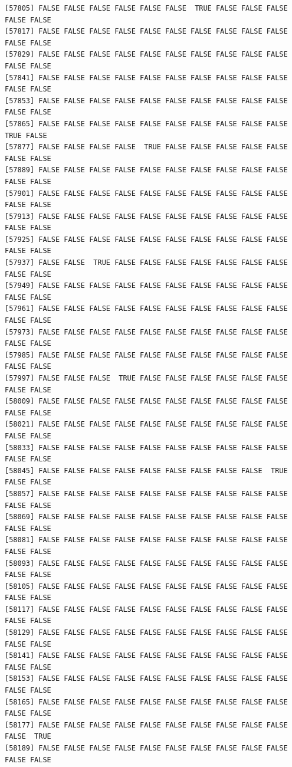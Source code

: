 \documentclass[
  a4paper,
  DIV=11,
  numbers=noendperiod]{scrartcl}
\begin{document}
\begin{verbatim}
[57805] FALSE FALSE FALSE FALSE FALSE FALSE  TRUE FALSE FALSE FALSE FALSE FALSE
[57817] FALSE FALSE FALSE FALSE FALSE FALSE FALSE FALSE FALSE FALSE FALSE FALSE
[57829] FALSE FALSE FALSE FALSE FALSE FALSE FALSE FALSE FALSE FALSE FALSE FALSE
[57841] FALSE FALSE FALSE FALSE FALSE FALSE FALSE FALSE FALSE FALSE FALSE FALSE
[57853] FALSE FALSE FALSE FALSE FALSE FALSE FALSE FALSE FALSE FALSE FALSE FALSE
[57865] FALSE FALSE FALSE FALSE FALSE FALSE FALSE FALSE FALSE FALSE  TRUE FALSE
[57877] FALSE FALSE FALSE FALSE  TRUE FALSE FALSE FALSE FALSE FALSE FALSE FALSE
[57889] FALSE FALSE FALSE FALSE FALSE FALSE FALSE FALSE FALSE FALSE FALSE FALSE
[57901] FALSE FALSE FALSE FALSE FALSE FALSE FALSE FALSE FALSE FALSE FALSE FALSE
[57913] FALSE FALSE FALSE FALSE FALSE FALSE FALSE FALSE FALSE FALSE FALSE FALSE
[57925] FALSE FALSE FALSE FALSE FALSE FALSE FALSE FALSE FALSE FALSE FALSE FALSE
[57937] FALSE FALSE  TRUE FALSE FALSE FALSE FALSE FALSE FALSE FALSE FALSE FALSE
[57949] FALSE FALSE FALSE FALSE FALSE FALSE FALSE FALSE FALSE FALSE FALSE FALSE
[57961] FALSE FALSE FALSE FALSE FALSE FALSE FALSE FALSE FALSE FALSE FALSE FALSE
[57973] FALSE FALSE FALSE FALSE FALSE FALSE FALSE FALSE FALSE FALSE FALSE FALSE
[57985] FALSE FALSE FALSE FALSE FALSE FALSE FALSE FALSE FALSE FALSE FALSE FALSE
[57997] FALSE FALSE FALSE  TRUE FALSE FALSE FALSE FALSE FALSE FALSE FALSE FALSE
[58009] FALSE FALSE FALSE FALSE FALSE FALSE FALSE FALSE FALSE FALSE FALSE FALSE
[58021] FALSE FALSE FALSE FALSE FALSE FALSE FALSE FALSE FALSE FALSE FALSE FALSE
[58033] FALSE FALSE FALSE FALSE FALSE FALSE FALSE FALSE FALSE FALSE FALSE FALSE
[58045] FALSE FALSE FALSE FALSE FALSE FALSE FALSE FALSE FALSE  TRUE FALSE FALSE
[58057] FALSE FALSE FALSE FALSE FALSE FALSE FALSE FALSE FALSE FALSE FALSE FALSE
[58069] FALSE FALSE FALSE FALSE FALSE FALSE FALSE FALSE FALSE FALSE FALSE FALSE
[58081] FALSE FALSE FALSE FALSE FALSE FALSE FALSE FALSE FALSE FALSE FALSE FALSE
[58093] FALSE FALSE FALSE FALSE FALSE FALSE FALSE FALSE FALSE FALSE FALSE FALSE
[58105] FALSE FALSE FALSE FALSE FALSE FALSE FALSE FALSE FALSE FALSE FALSE FALSE
[58117] FALSE FALSE FALSE FALSE FALSE FALSE FALSE FALSE FALSE FALSE FALSE FALSE
[58129] FALSE FALSE FALSE FALSE FALSE FALSE FALSE FALSE FALSE FALSE FALSE FALSE
[58141] FALSE FALSE FALSE FALSE FALSE FALSE FALSE FALSE FALSE FALSE FALSE FALSE
[58153] FALSE FALSE FALSE FALSE FALSE FALSE FALSE FALSE FALSE FALSE FALSE FALSE
[58165] FALSE FALSE FALSE FALSE FALSE FALSE FALSE FALSE FALSE FALSE FALSE FALSE
[58177] FALSE FALSE FALSE FALSE FALSE FALSE FALSE FALSE FALSE FALSE FALSE  TRUE
[58189] FALSE FALSE FALSE FALSE FALSE FALSE FALSE FALSE FALSE FALSE FALSE FALSE

\end{verbatim}
\end{document}
